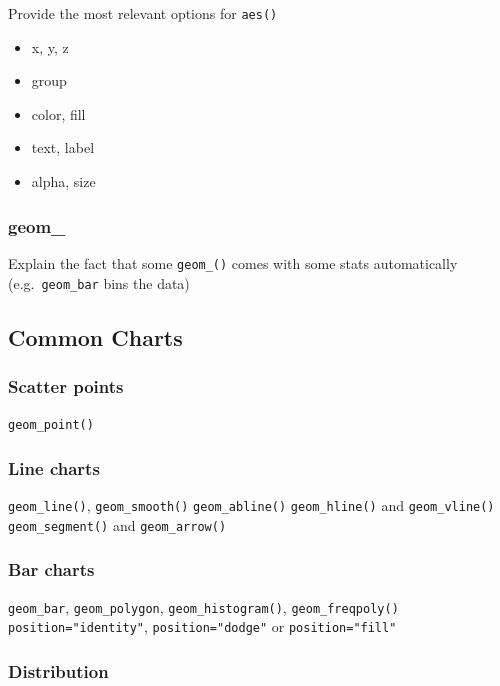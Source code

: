 \documentclass[
]{book}
\providecommand{\tightlist}{%
  \setlength{\itemsep}{0pt}\setlength{\parskip}{0pt}}
\begin{document}
Provide the most relevant options for \texttt{aes()}

\begin{itemize}
\tightlist
\item
  x, y, z
\item
  group
\item
  color, fill
\item
  text, label
\item
  alpha, size
\end{itemize}

\hypertarget{geom_}{%
\subsubsection{geom\_}\label{geom_}}

Explain the fact that some \texttt{geom\_()} comes with some stats automatically (e.g.~\texttt{geom\_bar} bins the data)

\hypertarget{common-charts}{%
\subsection{Common Charts}\label{common-charts}}

\hypertarget{scatter-points}{%
\subsubsection{Scatter points}\label{scatter-points}}

\texttt{geom\_point()}

\hypertarget{line-charts}{%
\subsubsection{Line charts}\label{line-charts}}

\texttt{geom\_line()}, \texttt{geom\_smooth()}
\texttt{geom\_abline()}
\texttt{geom\_hline()} and \texttt{geom\_vline()}
\texttt{geom\_segment()} and \texttt{geom\_arrow()}

\hypertarget{bar-charts}{%
\subsubsection{Bar charts}\label{bar-charts}}

\texttt{geom\_bar}, \texttt{geom\_polygon}, \texttt{geom\_histogram()}, \texttt{geom\_freqpoly()}
\texttt{position="identity"}, \texttt{position="dodge"} or \texttt{position="fill"}

\hypertarget{distribution}{%
\subsubsection{Distribution}\label{distribution}}
\end{document}
